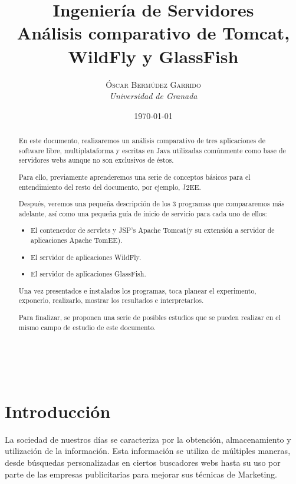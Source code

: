 \documentclass[a4paper, 10pt]{article}
\title{\textbf{Ingeniería de Servidores}\\ %
Análisis comparativo de Tomcat, WildFly y GlassFish} %
\author{ \textsc{Óscar Bermúdez Garrido} %
\\
{\textit{Universidad de Granada}}} %
\date{\today} %
\makeatletter
\renewcommand{\maketitle}{
  \begin{flushright} %
  
  {\LARGE\@title} %
  
  \vspace{50pt} %
  
  {\large\@author} %
  \\\@date %
  \vspace{40pt} %
  \end{flushright}
}
\makeatother
\begin{document}
\maketitle %

\renewcommand{\abstractname}{Resumen} %
\begin{abstract}
	 En este documento, realizaremos un análisis comparativo de tres aplicaciones
	 de software libre, multiplataforma y escritas en Java utilizadas comúnmente
	 como base de servidores webs aunque no son exclusivos de éstos.
	 
	 Para ello, previamente aprenderemos una serie de conceptos básicos para el
	 entendimiento del resto del documento, por ejemplo, J2EE.
	 
	 Después, veremos una pequeña descripción de los 3 programas que compararemos
	 más adelante, así como una pequeña guía de inicio de servicio para cada uno
	 de ellos:
	 
	 \begin{itemize}
	 	\item El contenerdor de servlets y JSP's Apache Tomcat(y su extensión a 
	 	servidor de aplicaciones Apache TomEE).
	 	\item El servidor de aplicaciones WildFly.
	 	\item El servidor de aplicaciones GlassFish.
	 \end{itemize}
	 
	 Una vez presentados e instalados los programas, toca planear el experimento,
	 exponerlo, realizarlo, mostrar los resultados e interpretarlos.
	 
	 Para finalizar, se proponen una serie de posibles estudios que se pueden
	 realizar en el mismo campo de estudio de este documento.
\end{abstract}

{\parskip=2pt
  \tableofcontents
}
\pagebreak


\section{Introducción}
	La sociedad de nuestros días se caracteriza por la obtención, almacenamiento y
	utilización de la información. Esta información se utiliza de múltiples maneras,
	desde búsquedas personalizadas en ciertos buscadores webs hasta su uso por parte
	de las empresas publicitarias para mejorar sus técnicas de Marketing.
	
\end{document}
